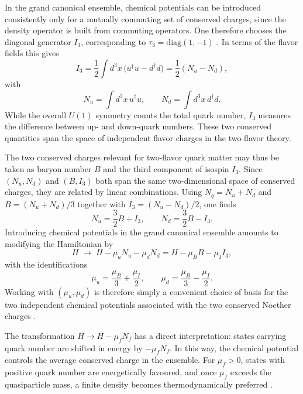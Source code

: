 In the grand canonical ensemble, chemical potentials can be introduced
consistently only for a mutually commuting set of conserved charges,
since the density operator is built from commuting operators. One
therefore chooses the diagonal generator $I_3$, corresponding to
$\tau_3=\mathrm{diag}(1,-1)$
\cite{WeinbergQFT,PeskinSchroeder1995}.
In terms of the flavor fields this gives
\begin{equation}
I_3
= \frac{1}{2}\int d^3x\,\big(u^\dagger u - d^\dagger d\big)
= \frac{1}{2}(N_u - N_d),
\end{equation}
with
\begin{equation}
N_u = \int d^3x\, u^\dagger u,
\qquad
N_d = \int d^3x\, d^\dagger d .
\end{equation}
While the overall $U(1)$ symmetry counts the total quark number,
$I_3$ measures the difference between up- and down-quark numbers.
These two conserved quantities span the space of independent
flavor charges in the two-flavor theory.

The two conserved charges relevant for two-flavor quark matter may
thus be taken as baryon number $B$ and the third component of isospin
$I_3$. Since $(N_u,N_d)$ and $(B,I_3)$ both span the same two-dimensional
space of conserved charges, they are related by linear combinations.
Using $N_q=N_u+N_d$ and $B=(N_u+N_d)/3$ together with $I_3=(N_u-N_d)/2$,
one finds
\begin{equation}
N_u = \frac{3}{2}B + I_3,
\qquad
N_d = \frac{3}{2}B - I_3 .
\label{eq:NuNd_from_BI3}
\end{equation}
Introducing chemical potentials in the grand canonical ensemble
amounts to modifying the Hamiltonian by
\begin{equation}
H \;\longrightarrow\; H - \mu_u N_u - \mu_d N_d
= H - \mu_B B - \mu_I I_3 ,
\label{eq:H_grand_canonical}
\end{equation}
with the identifications
\begin{equation}
\mu_u = \frac{\mu_B}{3} + \frac{\mu_I}{2},
\qquad
\mu_d = \frac{\mu_B}{3} - \frac{\mu_I}{2}.
\end{equation}
Working with $(\mu_u,\mu_d)$ is therefore simply a convenient choice of
basis for the two independent chemical potentials associated with the
two conserved Noether charges \cite{KapustaGale,LaineVuorinen}.

The transformation $H \to H - \mu_f N_f$ has a direct interpretation:
states carrying quark number are shifted in energy by $-\mu_f N_f$.
In this way, the chemical potential controls the average conserved
charge in the ensemble. For $\mu_f>0$, states with positive quark
number are energetically favoured, and once $\mu_f$ exceeds the
quasiparticle mass, a finite density becomes thermodynamically
preferred \cite{KapustaGale,LaineVuorinen}.

